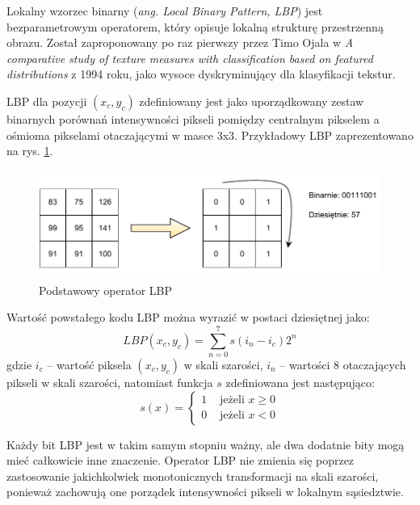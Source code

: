 Lokalny wzorzec binarny (\emph{ang. Local Binary Pattern, LBP}) jest bezparametrowym operatorem, który opisuje lokalną strukturę przestrzenną obrazu. Został zaproponowany po raz pierwszy przez Timo Ojala w \emph{A comparative study of texture measures with classification based on featured distributions}\cite{OJALA94} z 1994 roku, jako wysoce dyskryminujący dla klasyfikacji tekstur.

LBP dla pozycji $(x_c, y_c)$ zdefiniowany jest jako uporządkowany zestaw binarnych porównań intensywności pikseli pomiędzy centralnym pikselem a ośmioma pikselami otaczającymi w masce 3x3. Przykładowy LBP zaprezentowano na rys. \ref{fig:lbp-operator}.

\begin{figure}[h]
	\centering
	\includegraphics[scale=1.0]{graphics/01_podstawy_teoretyczne/lbp-operator.pdf}
	\caption{ Podstawowy operator LBP \cite{HEUSCH06} }
	\label{fig:lbp-operator}
\end{figure}

Wartość powstałego kodu LBP można wyrazić w postaci dziesiętnej jako:
\begin{equation} 
\label{lbp_lbp} 
LBP(x_c, y_c) = \sum\limits_{n = 0}^7 s(i_n - i_c) 2^n
\end{equation} gdzie $i_c$ -- wartość piksela $(x_c, y_c)$ w skali szarości, $i_n$ -- wartości 8 otaczających pikseli w skali szarości, natomiast funkcja $s$ zdefiniowana jest następująco:
\begin{equation} 
\label{lbp_s} 
s(x) = 
	\begin{cases}
		1 & \text{ jeżeli } x \geq 0 \\
		0 & \text{ jeżeli } x < 0
	\end{cases} 
\end{equation}

Każdy bit LBP jest w takim samym stopniu ważny, ale dwa dodatnie bity mogą mieć całkowicie inne znaczenie. Operator LBP nie zmienia się poprzez zastosowanie jakichkolwiek monotonicznych transformacji na skali szarości, ponieważ zachowują one porządek intensywności pikseli w lokalnym sąsiedztwie.

